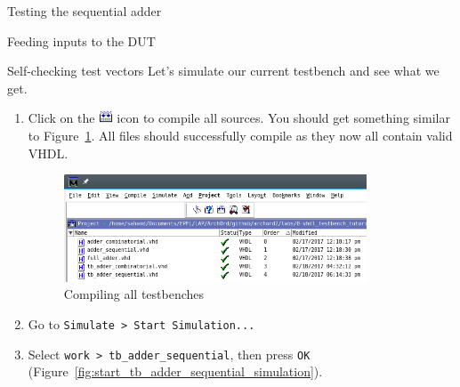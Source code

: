 \documentclass[lab]{course}
\begin{document}
\begin{section}{Testing the sequential adder}
\begin{subsection}{Feeding inputs to the DUT}
\begin{subsubsection}{Self-checking test vectors}
            Let's simulate our current testbench and see what we get.

            \begin{enumerate}
                \item Click on the \includegraphics[height=11pt]{figs/compile_all_icon.png} icon to compile all sources. You should get something similar to Figure~\ref{fig:compiling_with_sequential_testbench}. All files should successfully compile as they now all contain valid VHDL.

                \begin{figure}[!h]
                    \begin{centering}
                        \includegraphics[width=0.85\textwidth]{figs/compiling_with_sequential_testbench.png}
                        \caption{Compiling all testbenches}
                        \label{fig:compiling_with_sequential_testbench}
                    \end{centering}
                \end{figure}

                \item Go to \verb+Simulate > Start Simulation...+

                \item Select \verb+work > tb_adder_sequential+, then press \verb+OK+ (Figure~\ref{fig:start_tb_adder_sequential_simulation}).


\end{enumerate}
\end{subsubsection}
\end{subsection}
\end{section}
\end{document}
